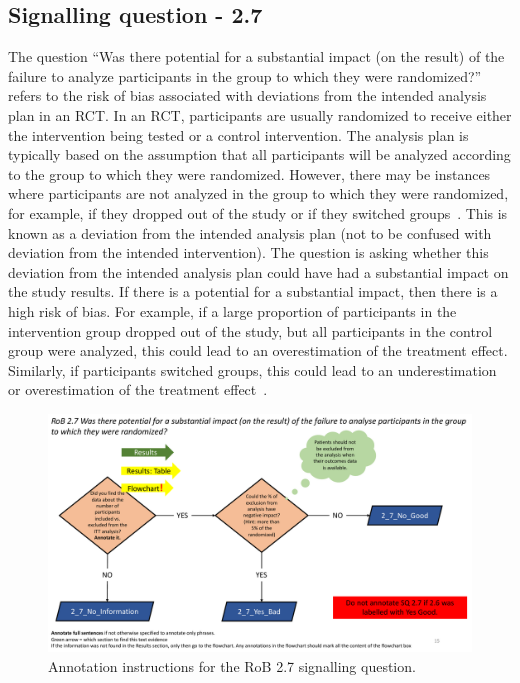 \documentclass[sn-mathphys,Numbered]{sn-jnl}%
\begin{document}
\subsection*{Signalling question - 2.7 }
\label{subsec:2_7}
%
The question ``Was there potential for a substantial impact (on the result) of the failure to analyze participants in the group to which they were randomized?'' refers to the risk of bias associated with deviations from the intended analysis plan in an RCT.
In an RCT, participants are usually randomized to receive either the intervention being tested or a control intervention.
The analysis plan is typically based on the assumption that all participants will be analyzed according to the group to which they were randomized.
However, there may be instances where participants are not analyzed in the group to which they were randomized, for example, if they dropped out of the study or if they switched groups~\cite{lewis2020dropout,kaufmann1995chapter}. %
This is known as a deviation from the intended analysis plan (not to be confused with deviation from the intended intervention).
The question is asking whether this deviation from the intended analysis plan could have had a substantial impact on the study results.
If there is a potential for a substantial impact, then there is a high risk of bias.
For example, if a large proportion of participants in the intervention group dropped out of the study, but all participants in the control group were analyzed, this could lead to an overestimation of the treatment effect.
Similarly, if participants switched groups, this could lead to an underestimation or overestimation of the treatment effect~\cite{gupta2011intention}.


%
%
%
\begin{figure}[hbt]
    \centering
    \includegraphics[width=\textwidth]{figures/2_7.pdf}
    \caption{Annotation instructions for the RoB 2.7 signalling question.}
    \label{fig:2_7}
\end{figure}
%
%
%
\end{document}
